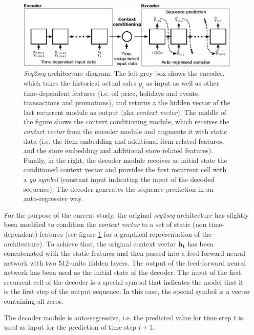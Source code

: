 \documentclass{elsarticle}
\begin{document}
	\begin{figure}[h!]
		\centering
		\includegraphics[width=1\linewidth]{img/s2s}
		\caption{\textit{Seq2seq} architecture diagram. The left grey box shows the encoder, which takes the historical actual sales $y_i$ as input as well as other time-dependent features (i.e. oil price, holidays and events, transactions and promotions), and returns a the hidden vector of the last recurrent module as output (aka \textit{context vector}). The middle of the figure shows the context conditioning module, which receives the \textit{context vector} from the encoder module and augments it with static data (i.e. the item embedding and additional item related features, and the store embedding and additional store related features). Finally, in the right, the decoder module receives as initial state the conditioned context vector and provides the first recurrent cell with a \textit{go symbol} (constant input indicating the input of the decoded sequence). The decoder generates the sequence prediction in an auto-regressive way.}
		\label{fig:s2s}
	\end{figure}
	
   For the purpose of the current study, the original \textit{seq2seq} architecture has slightly been modified to condition the \textit{context vector} to a set of static (non time-dependent) features (see figure \ref{fig:s2s} for a graphical representation of the architecture). To achieve that, the original context vector $\mathbf{h_t}$ has been concatenated with the static features and then passed into a feed-forward neural network with two 512-units hidden layers. The output of the feed-forward neural network has been used as the initial state of the decoder. The input of the first recurrent cell of the decoder is a special symbol that indicates the model that it is the first step of the output sequence. In this case, the special symbol is a vector containing all zeros. 
   
   The decoder module is auto-regressive, i.e. the predicted value for time step $t$ is used as input for the prediction of time step $t+1$.
   
\end{document}
